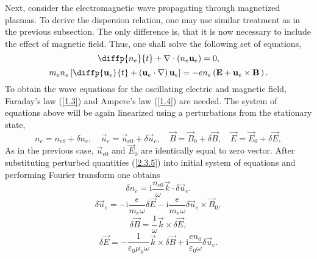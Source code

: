 Next, consider the electromagnetic wave propagating through magnetized plasmas. To derive the dispersion relation, one may use similar treatment as in the previous subsection. The only difference is, that it is now necessary to include the effect of magnetic field. Thus, one shall solve the following set of equations,
\begin{equation}
\label{2.3.1}
\diffp{n_e}{t} + \nabla \cdot \left(n_e \vec{u}_e \right) = 0,
\end{equation}
\begin{equation}
\label{2.3.2}
m_e n_e \left[ \diffp{\vec{u}_e}{t} + \left(\vec{u}_e \cdot \nabla \right) \vec{u}_e \right] = - e n_e \left(\vec{E} + \vec{u}_e \times \vec{B} \, \right).
\end{equation}
To obtain the wave equations for the oscillating electric and magnetic field, Faraday's law (\ref{1.3}) and Ampere's law (\ref{1.4}) are needed. The system of equations above will be again linearized using a perturbations from the stationary state,
\begin{equation}
\label{2.3.4}
n_{e} = n_{e0} + \delta n_{e}, \quad \vec{u}_{e} = \vec{u}_{e0} + \delta \vec{u}_{e}, \quad \vec{B} = \vec{B}_{0} + \delta \vec{B}, \quad \vec{E} = \vec{E}_{0} + \delta \vec{E},
\end{equation}
As in the previous case, $ \vec{u}_{e0} $ and $ \vec{E}_{0} $ are identically equal to zero vector. After substituting perturbed quantities (\ref{2.3.5}) into initial system of equations and performing Fourier transform one obtains
\begin{equation}
\label{2.3.5}
\delta n_{e} = \mathrm{i} \frac{n_{e0}}{\omega} \vec{k} \cdot \delta \vec{u}_{e}.
\end{equation}
\begin{equation}
\label{2.3.6}
\delta \vec{u}_{e} = - \mathrm{i} \frac{e}{m_{e} \omega} \delta \vec{E} - \mathrm{i} \frac{e}{m_{e} \omega} \delta \vec{u}_{e} \times \vec{B}_{0},
\end{equation}
\begin{equation}
\label{2.3.7}
\delta \vec{B} = \frac{1}{\omega} \vec{k} \times \delta \vec{E},
\end{equation}
\begin{equation}
\label{2.3.8}
\delta \vec{E} = - \frac{1}{\varepsilon_{0} \mu_{0} \omega} \vec{k} \times \delta \vec{B} + \mathrm{i} \frac{e n_{0}}{\varepsilon_{0} \omega} \delta \vec{u}_{e}.
\end{equation}

